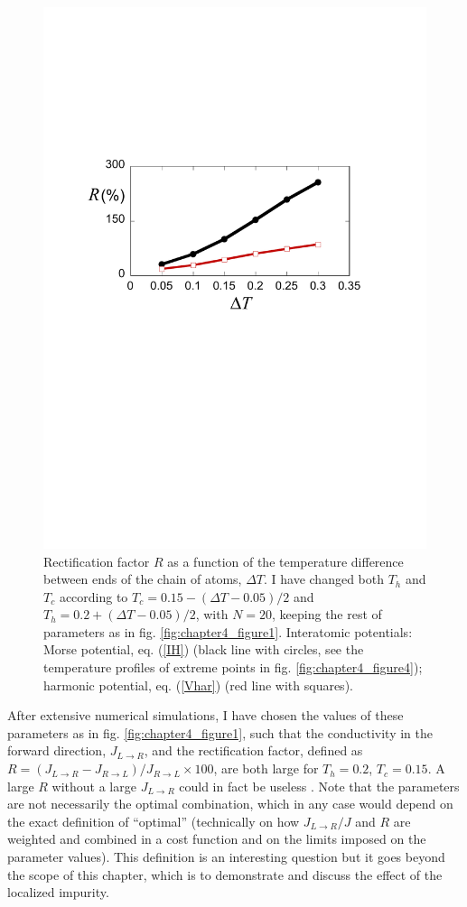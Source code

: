 \begin{figure}
\centering
\includegraphics[width=0.75\linewidth]{Figures/FIG5new.pdf}
\caption{Rectification factor $R$ as a function of the temperature difference between ends of the chain of atoms, $\Delta T$.
I have changed both $T_h$ and $T_c$ according to $T_c=0.15-(\Delta T-0.05)/2$ and $T_h=0.2+(\Delta T-0.05)/2$, with $N=20$,  keeping the rest of parameters as in fig. \ref{fig:chapter4_figure1}.
Interatomic potentials: Morse potential, eq. (\ref{IH}) (black line with circles, see the temperature profiles of extreme points in fig. \ref{fig:chapter4_figure4}); harmonic potential, eq. (\ref{Vhar}) (red line with squares).}
\label{fig:chapter4_figure5}
\end{figure}

After extensive numerical simulations, I have chosen the values of these parameters as in fig. \ref{fig:chapter4_figure1}, such that the conductivity in the forward direction, $J_{L\rightarrow R}$, and the rectification factor, defined as $R=(J_{L\rightarrow R}-J_{R\rightarrow L}) / J_{R\rightarrow L}\times 100$,
are both large for $T_h=0.2$, $T_c=0.15$. A large $R$ without a large $J_{L\rightarrow R}$ could in fact be useless \cite{Roberts2011}.
Note that the parameters are not necessarily the optimal combination, which in any case would depend on the exact definition of ``optimal'' (technically on how $J_{L\rightarrow R}/J$ and $R$ are weighted and combined in a cost function and on the limits imposed on the
parameter values). This definition is an interesting question but it goes beyond the scope of this chapter, which is to demonstrate and discuss the effect of the localized impurity.

